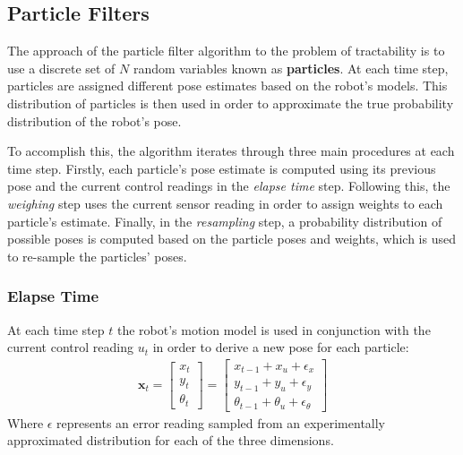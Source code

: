 \documentclass[letterpaper, 12 pt, conference]{ieeeconf}  %
\begin{document}
\subsection{Particle Filters}

The approach of the particle filter algorithm to the problem of tractability is to use a discrete set of $N$ random variables known as \textbf{particles}. At each time step, particles are assigned different pose estimates based on the robot's models. This distribution of particles is then used in order to approximate the true probability distribution of the robot's pose. 
\par
To accomplish this, the algorithm iterates through three main procedures at each time step. Firstly, each particle's pose estimate is computed using its previous pose and the current control readings in the \textit{elapse time} step. Following this, the \textit{weighing} step uses the current sensor reading in order to assign weights to each particle's estimate. Finally, in the \textit{resampling} step, a probability distribution of possible poses is computed based on the particle poses and weights, which is used to re-sample the particles' poses. 

\subsubsection{Elapse Time}
At each time step $t$ the robot's motion model is used in conjunction with the current control reading $u_t$ in order to derive a new pose for each particle:
\begin{align*}
\textbf{x}_t = \begin{bmatrix}
				x_t \\
				y_t \\
				\theta _t
				\end{bmatrix} 
				=
				\begin{bmatrix}
				x_{t-1} + x_u + \epsilon _x\\
				y_{t-1} + y_u + \epsilon _y\\
				\theta _{t-1} + \theta _u + \epsilon _\theta				
				\end{bmatrix}
\end{align*}
Where $\epsilon$ represents an error reading sampled from an experimentally approximated distribution for each of the three dimensions. 
\end{document}

